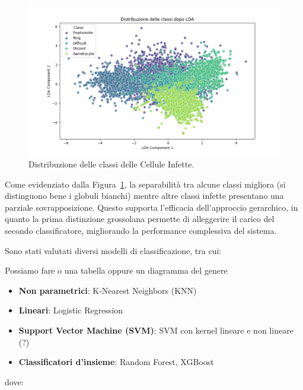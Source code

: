 \documentclass[minted, draw]{../tex/hebdomon}
\begin{document}
\begin{itemize}
% 
\begin{figure}[H]
  \centering
  \includegraphics[width=.8\linewidth]{figures/lda_distribution.png}
  \caption{Distribuzione delle classi delle Cellule Infette.}
  \label{fig:lda_infette}
\end{figure}
%

Come evidenziato dalla Figura~\ref{fig:lda_infette}, la separabilità tra alcune classi migliora (si distinguono bene i globuli bianchi) mentre altre classi infette presentano una parziale sovrapposizione. Questo supporta l’efficacia dell’approccio gerarchico, in quanto la prima distinzione grossolana permette di alleggerire il carico del secondo classificatore, migliorando la performance complessiva del sistema.

\end{itemize}

Sono stati valutati diversi modelli di classificazione, tra cui:

Possiamo fare o una tabella oppure un diagramma del genere



\begin{itemize}
\item \textbf{Non parametrici}: K-Nearest Neighbors (KNN)
\item \textbf{Lineari}: Logistic Regression
\item \textbf{Support Vector Machine (SVM)}: SVM con kernel lineare e non lineare (?)  
\item \textbf{Classificatori d’insieme}: Random Forest, XGBoost
\end{itemize}

dove:
\end{document}
